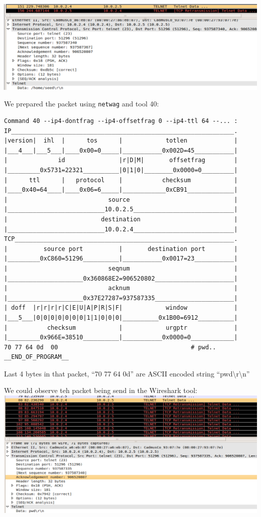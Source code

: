 \documentclass[12pt, a4paper]{article}
\begin{document}
\includegraphics[width=.95\textwidth]{gfx/response.png}

We prepared the packet using \texttt{netwag} and tool 40:\\
\begin{verbatim}
Command 40 --ip4-dontfrag --ip4-offsetfrag 0 --ip4-ttl 64 --... :
IP______________________________________________________________.
|version|  ihl  |      tos      |            totlen             |
|___4___|___5___|____0x00=0_____|___________0x002D=45___________|
|              id               |r|D|M|       offsetfrag        |
|_________0x5731=22321__________|0|1|0|________0x0000=0_________|
|      ttl      |   protocol    |           checksum            |
|____0x40=64____|____0x06=6_____|____________0xCB91_____________|
|                            source                             |
|___________________________10.0.2.5____________________________|
|                          destination                          |
|___________________________10.0.2.4____________________________|
TCP_____________________________________________________________.
|          source port          |       destination port        |
|_________0xC860=51296__________|___________0x0017=23___________|
|                            seqnum                             |
|_____________________0x360868E2=906520802______________________|
|                            acknum                             |
|_____________________0x37E27287=937587335______________________|
| doff  |r|r|r|r|C|E|U|A|P|R|S|F|            window             |
|___5___|0|0|0|0|0|0|0|1|1|0|0|0|__________0x1B00=6912__________|
|           checksum            |            urgptr             |
|_________0x966E=38510__________|___________0x0000=0____________|
70 77 64 0d  00                                     # pwd..
__END_OF_PROGRAM__
\end{verbatim}
Last 4 bytes in that packet, ``70 77 64 0d'' are ASCII encoded string ``pwd\textbackslash r\textbackslash n''


We could observe teh packet being send in the Wireshark tool:\\ \includegraphics[width=.95\textwidth]{gfx/request.png}\\
\end{document}
